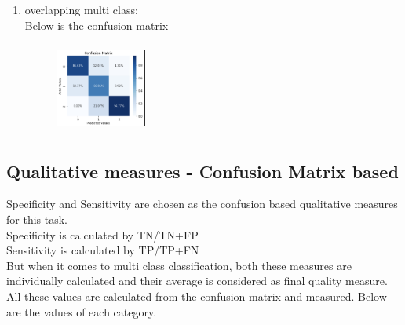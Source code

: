 \documentclass[conference]{IEEEtran}
\begin{document}
\begin{enumerate}
\begin{figure}[!htbp]
\end{figure}
\item
overlapping multi class: \\
Below is the confusion matrix \\
\begin{figure}[!htbp]
    \centering
    \includegraphics[width=3cm, height=3cm]{task2.24.png}
    \label{fig:my_label}
\end{figure}
\end{enumerate}
\subsection{Qualitative measures - Confusion Matrix based}
Specificity and Sensitivity are chosen as the confusion based qualitative measures for this task. \\
Specificity is calculated by TN/TN+FP \\
Sensitivity is calculated by TP/TP+FN \\
But when it comes to multi class classification, both these measures are individually calculated and their average is considered as final quality measure. \\
All these values are calculated from the confusion matrix and measured. Below are the values of each category. \\
\end{document}
